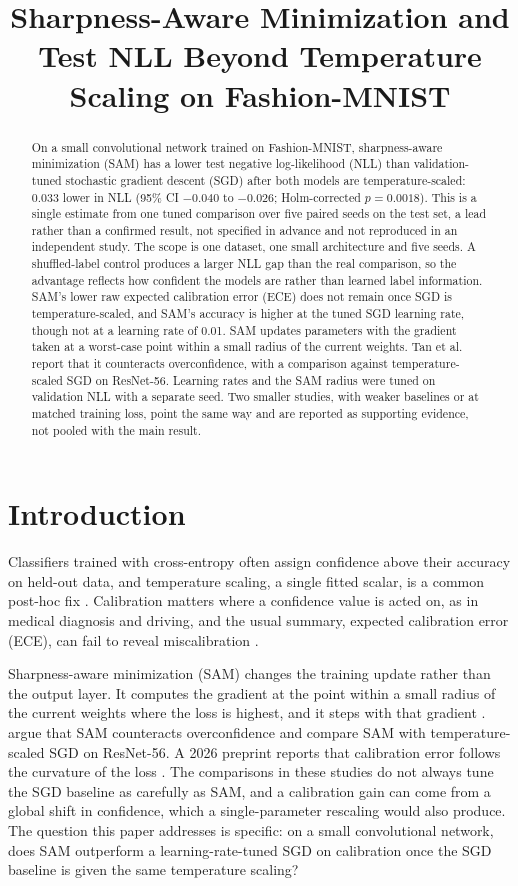 \documentclass[11pt,letterpaper]{article}
\title{Sharpness-Aware Minimization and Test NLL Beyond Temperature Scaling on Fashion-MNIST}
\author{}
\date{}
\begin{document}
\maketitle

\begin{abstract}
On a small convolutional network trained on Fashion-MNIST, sharpness-aware minimization (SAM) has a lower test negative log-likelihood (NLL) than validation-tuned stochastic gradient descent (SGD) after both models are temperature-scaled: 0.033 lower in NLL (95\% CI $-0.040$ to $-0.026$; Holm-corrected $p = 0.0018$). This is a single estimate from one tuned comparison over five paired seeds on the test set, a lead rather than a confirmed result, not specified in advance and not reproduced in an independent study. The scope is one dataset, one small architecture and five seeds. A shuffled-label control produces a larger NLL gap than the real comparison, so the advantage reflects how confident the models are rather than learned label information. SAM's lower raw expected calibration error (ECE) does not remain once SGD is temperature-scaled, and SAM's accuracy is higher at the tuned SGD learning rate, though not at a learning rate of 0.01. SAM updates parameters with the gradient taken at a worst-case point within a small radius of the current weights. Tan et al. report that it counteracts overconfidence, with a comparison against temperature-scaled SGD on ResNet-56. Learning rates and the SAM radius were tuned on validation NLL with a separate seed. Two smaller studies, with weaker baselines or at matched training loss, point the same way and are reported as supporting evidence, not pooled with the main result.
\end{abstract}

\section{Introduction}
Classifiers trained with cross-entropy often assign confidence above their accuracy on held-out data, and temperature scaling, a single fitted scalar, is a common post-hoc fix \citep{Guo2017}. Calibration matters where a confidence value is acted on, as in medical diagnosis and driving, and the usual summary, expected calibration error (ECE), can fail to reveal miscalibration \citep{Nixon2019}.

Sharpness-aware minimization (SAM) changes the training update rather than the output layer. It computes the gradient at the point within a small radius of the current weights where the loss is highest, and it steps with that gradient \citep{Foret2020}. \citet{Tan2026} argue that SAM counteracts overconfidence and compare SAM with temperature-scaled SGD on ResNet-56. A 2026 preprint reports that calibration error follows the curvature of the loss \citep{Morosini2026}. The comparisons in these studies do not always tune the SGD baseline as carefully as SAM, and a calibration gain can come from a global shift in confidence, which a single-parameter rescaling would also produce. The question this paper addresses is specific: on a small convolutional network, does SAM outperform a learning-rate-tuned SGD on calibration once the SGD baseline is given the same temperature scaling?
\end{document}
